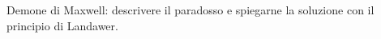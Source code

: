 \question  Demone di Maxwell: descrivere il paradosso e spiegarne la soluzione con il principio di Landawer.
